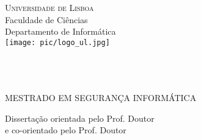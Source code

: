 \begin{center}
\vspace{3cm}\normalfont\normalfont
\textsc{\huge{Universidade de Lisboa}}\\
\LARGE{Faculdade de Ci\^{e}ncias}\\
\Large{Departamento de Inform\'{a}tica}\\
\vspace{1cm}
\texttt{[image: pic/logo\_ul.jpg]}\\
\vspace{2cm}
\PEIIdiomaTese
\Large{\bf \PEITITULO}\\
\vspace{1.5 cm}
\Large{\bf \PEIAutor}\\
\vspace{2 cm}
\Large{\bf \PEITIPO}\\
\end{center}
\vspace{0.5 cm}
\begin{center}
\Large{MESTRADO EM SEGURANÇA INFORM\'{A}TICA}\\

\end{center}
\vspace{1 cm}
Disserta\c{c}\~{a}o orientada pelo Prof. Doutor \PEIOrientador \\
e co-orientado pelo Prof. Doutor \PEICoOrientador \\
\vfill
\begin{center}
\large\PEIAno
\end{center}
\newpage
\thispagestyle{empty}
\mbox{}
\newpage
